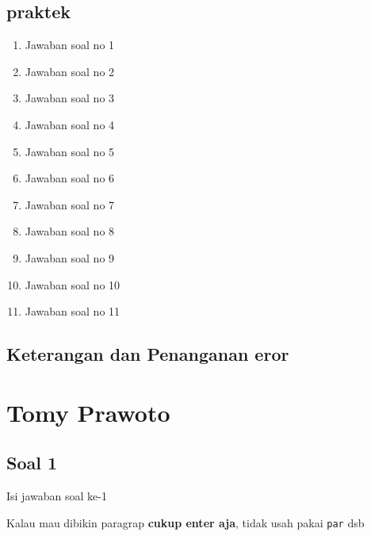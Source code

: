 \subsection{praktek}
\begin{enumerate}
	\item Jawaban soal no 1
	
	\item Jawaban soal no 2
	
	\item Jawaban soal no 3
	
	\item Jawaban soal no 4
	
	\item Jawaban soal no 5
	
	\item Jawaban soal no 6
	
	\item Jawaban soal no 7
	
	\item Jawaban soal no 8
	
	\item Jawaban soal no 9
	
	\item Jawaban soal no 10
	
	\item Jawaban soal no 11
	
\end{enumerate}

\subsection{Keterangan dan Penanganan eror}


\section{Tomy Prawoto}
\subsection{Soal 1}
Isi jawaban soal ke-1

Kalau mau dibikin paragrap \textbf{cukup enter aja}, tidak usah pakai \verb|par| dsb


